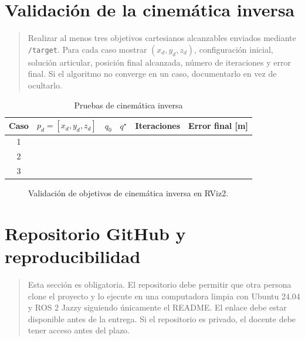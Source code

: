 \documentclass[journal]{IEEEtran}
\newcommand{\instr}[1]{%
\begin{quote}
\small
\noindent\textbf{\color{blue}{INSTRUCCIÓN:}} #1
\end{quote}
}
\newcommand{\pendiente}[1]{\textbf{\color{red}{[#1]}}}
\begin{document}
\section{Validación de la cinemática inversa}

\instr{Realizar al menos tres objetivos cartesianos alcanzables enviados mediante \texttt{/target}. Para cada caso mostrar $(x_d,y_d,z_d)$, configuración inicial, solución articular, posición final alcanzada, número de iteraciones y error final. Si el algoritmo no converge en un caso, documentarlo en vez de ocultarlo.}

\begin{table}[t]
\centering
\caption{Pruebas de cinemática inversa}
\label{tab:ik_validation}
\begin{tabular}{cccccc}
\toprule
\textbf{Caso} &
\textbf{$p_d=[x_d,y_d,z_d]$} &
\textbf{$q_0$} &
\textbf{$q^\star$} &
\textbf{Iteraciones} &
\textbf{Error final [m]} \\
\midrule
1 & \pendiente{...} & \pendiente{...} & \pendiente{...} & \pendiente{...} & \pendiente{...} \\
2 & \pendiente{...} & \pendiente{...} & \pendiente{...} & \pendiente{...} & \pendiente{...} \\
3 & \pendiente{...} & \pendiente{...} & \pendiente{...} & \pendiente{...} & \pendiente{...} \\
\bottomrule
\end{tabular}
\end{table}

\begin{figure}[H]
    \centering
    \caption{Validación de objetivos de cinemática inversa en RViz2.}
\end{figure}

\section{Repositorio GitHub y reproducibilidad}

\instr{Esta sección es obligatoria. El repositorio debe permitir que otra persona clone el proyecto y lo ejecute en una computadora limpia con Ubuntu 24.04 y ROS 2 Jazzy siguiendo únicamente el README. El enlace debe estar disponible antes de la entrega. Si el repositorio es privado, el docente debe tener acceso antes del plazo.}
\end{document}
